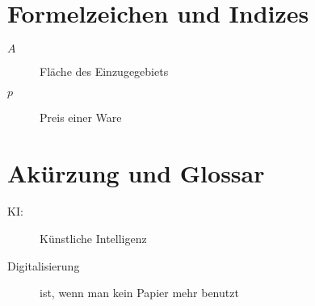 
\section *{Formelzeichen und Indizes} %

\begin{description}
\item[$A$] Fläche des Einzugegebiets
\item[$p$] Preis einer Ware
\end{description}

\section *{Akürzung und Glossar}
\begin{description}
\item[KI:] Künstliche Intelligenz
\item[Digitalisierung] ist, wenn man kein Papier mehr benutzt
\end{description}

